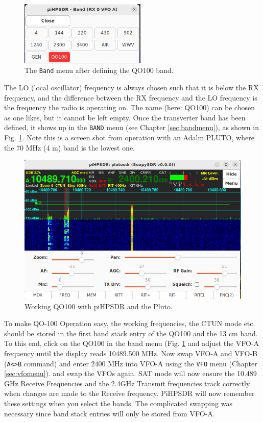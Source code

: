 \documentclass[12pt]{book}
\def\bltt#1{\texttt{\color{blue}#1}}
\def\pH{pi\-HPSDR\xspace}
\begin{document}
\begin{figure}[ht]
\center
\includegraphics[width=6cm]{QO100-BandMenu.png}
\caption{The \bltt{Band} menu after defining the QO100 band.}
\label{fig:QO100-BandMenu}
\end{figure}

The LO (local oscillator) frequency is always chosen such that it is below the RX frequency,
and the difference between the RX frequency and the LO frequency is the frequency the radio
is operating on. The name (here: QO100) can be chosen as one likes, but it cannot be left
empty. Once the transverter band has been defined, it shows up in the \bltt{BAND} menu
(see Chapter \ref{sec:bandmenu}), as shown in Fig. \ref{fig:QO100-BandMenu}. Note this is
a screen shot from operation with an Adalm PLUTO, where the 70 MHz (4 m) band is the lowest one.

\begin{figure}[ht]
\center
\includegraphics[width=12cm]{QO100-Waterfall.png}
\caption{Working QO100 with \pH and the Pluto.}
\label{fig:QO100-Waterfall}
\end{figure}



To make QO-100 Operation easy, the working frequencies, the CTUN mode etc. should be
stored in the first band stack entry of the QO100 and the 13 cm band. To this end,
click on the QO100 in the band menu (Fig. \ref{fig:QO100-BandMenu} and adjust the VFO-A
frequency until the display reads 10489.500 MHz. Now swap VFO-A and VFO-B (\bltt{A<>B} command)
and enter 2400 MHz into VFO-A using the \bltt{VFO} menu (Chapter \ref{sec:vfomenu}). and
swap the VFOs again. SAT mode will now ensure the 10.489 GHz Receive
 Frequencies and the 2.4GHz Transmit frequencies track correctly when changes are made
 to the Receive frequency. PiHPSDR will now remember these settings when you select
 the bands. The complicated swapping was necessary since band stack entries will
 only be stored from VFO-A.
\end{document}
